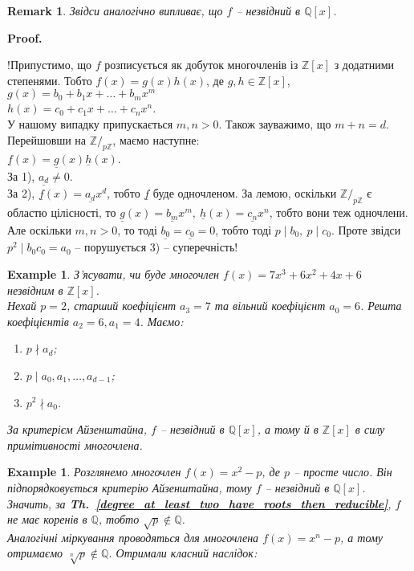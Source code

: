 \documentclass[a4paper, 10pt]{article}
\makeatletter
\theoremstyle{theoremdd}
\theoremstyle{theoremdd}
\theoremstyle{theoremdd}
\theoremstyle{theoremdd}
\theoremstyle{theoremdd}
\newtheorem{example}[theorem]{Example}
\theoremstyle{theoremdd}
\theoremstyle{theoremdd}
\theoremstyle{theoremdd}
\theoremstyle{theoremdd}
\theoremstyle{theoremdd}
\theoremstyle{theoremdd}
\newtheorem{remark}[theorem]{Remark}
\theoremstyle{theoremdd}
\theoremstyle{theoremdd}
\theoremstyle{theoremdd}
\theoremstyle{theoremdd}
\renewenvironment{proof}[1][Proof.\\]{\par
\pushQED{\hfill \qed}%
\normalfont \topsep6\p@\@plus6\p@\relax
\trivlist
\item\relax
{\bfseries
#1\@addpunct{.}}\hspace\labelsep\ignorespaces
}{%
\popQED\endtrivlist\@endpefalse
}
\newcommand\thref[1]{\textbf{Th.~\ref{#1}}}
\makeatother
\begin{document}
\begin{remark}
Звідси аналогічно випливає, що $f$ -- незвідний в $\mathbb{Q}[x]$.
\end{remark}

\begin{proof}
!Припустимо, що $f$ розписується як добуток многочленів із $\mathbb{Z}[x]$ з додатними степенями. Тобто $f(x) = g(x) h(x)$, де $g,h \in \mathbb{Z}[x]$,\\
$g(x) = b_0 + b_1 x + \dots + b_m x^m$\\
$h(x) = c_0 + c_1 x + \dots + c_n x^n$.\\
У нашому випадку припускається $m,n > 0$. Також зауважимо, що $m + n = d$. Перейшовши на $\mathbb{Z}/_{p \mathbb{Z}}$, маємо наступне:\\
$\underline{f}(x) = \underline{g}(x) \underline{h}(x)$.\\
За 1), $\underline{a_d} \neq 0$.\\
За 2), $\underline{f}(x) = \underline{a_d} x^d$, тобто $\underline{f}$ буде одночленом. За лемою, оскільки $\mathbb{Z}/_{p \mathbb{Z}}$ є областю цілісності, то $\underline{g}(x) = \underline{b_m} x^m,\ \underline{h}(x) = \underline{c_n} x^n$, тобто вони теж одночлени. Але оскільки $m,n > 0$, то тоді $\underline{b_0} = \underline{c_0} = 0$, тобто тоді $p \mid b_0,\ p \mid c_0$. Проте звідси $p^2 \mid b_0 c_0 = a_0$ -- порушується 3) -- суперечність!
\end{proof}

\begin{example}
З'ясувати, чи буде многочлен $f(x) = 7x^3 + 6x^2 + 4x + 6$ незвідним в $\mathbb{Z}[x]$.\\
Нехай $p = 2$, старший коефіцієнт $a_3 = 7$ та вільний коефіцієнт $a_0 = 6$. Решта коефіцієнтів $a_2 = 6, a_1 = 4$. Маємо:
\begin{enumerate}[nosep, wide=0pt, label={\arabic*)}]
\item $p \nmid a_d$;
\item $p \mid a_0,a_1,\dots,a_{d-1}$;
\item $p^2 \nmid a_0$.
\end{enumerate}
За критерієм Айзенштайна, $f$ -- незвідний в $\mathbb{Q}[x]$, а тому й в $\mathbb{Z}[x]$ в силу примітивності многочлена.
\end{example}

\begin{example}
Розглянемо многочлен $f(x) = x^2 - p$, де $p$ -- просте число. Він підпорядковується критерію Айзенштайна, тому $f$ -- незвідний в $\mathbb{Q}[x]$. Значить, за \thref{degree_at_least_two_have_roots_then_reducible}, $f$ не має коренів в $\mathbb{Q}$, тобто $\sqrt{p} \notin \mathbb{Q}$.\\
Аналогічні міркування проводяться для многочлена $f(x) = x^n - p$, а тому отримаємо $\sqrt[n]{p} \notin \mathbb{Q}$. Отримали класний наслідок:
\end{example}
\end{document}
